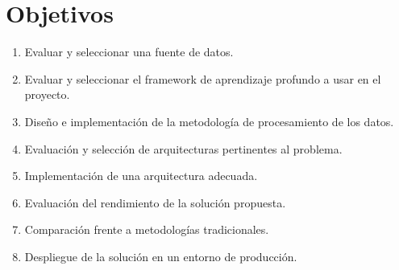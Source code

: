 \section{Objetivos}

\begin{enumerate}[label=\arabic*.] 
    \item Evaluar y seleccionar una fuente de datos.
    \item Evaluar y seleccionar el framework de aprendizaje profundo a usar en el proyecto.
    \item Diseño e implementación de la metodología de procesamiento de los datos.
    \item Evaluación y selección de arquitecturas pertinentes al problema.
    \item Implementación de una arquitectura adecuada.
    \item Evaluación del rendimiento de la solución propuesta.
    \item Comparación frente a metodologías tradicionales.
    \item Despliegue de la solución en un entorno de producción.
\end{enumerate}

\newpage
